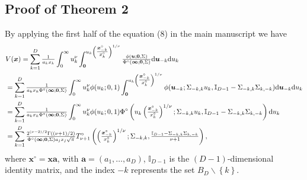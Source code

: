 \documentclass[lineno]{biometrika}
\begin{document}
\subsection{Proof of Theorem 2}
By applying the first half of the equation (8) in the main manuscript %
we have 
\begin{align}
& V(\bm x) = \sum_{k=1}^D{\textstyle{1\over a_kx_k}}\int_0^\infty u_k^\nu \int_{\bm 0}^{u_k \left({\textstyle{\bm x_{-k}^\circ\over x_{k}^\circ}}\right)^{1/\nu}} {\textstyle{\phi(\bm u;\bm 0, \Sigma)\over\Phi^\circ(\bm \infty;\bm 0, \Sigma)}}\text d \bm u_{-k}\text d u_k \nonumber \\ 
&=\sum_{k=1}^D{\textstyle{1\over a_k x_k \Phi^\circ(\bm \infty;\bm 0, \Sigma)}}\int_0^\infty u_k^\nu \phi(u_k;0, 1) \int_{\bm 0}^{u_k\left({\textstyle{\bm x_{-k}^\circ\over x_k^\circ}}\right)^{1/\nu}}\phi(\bm u_{-k}; \Sigma_{-k,k}u_k, \mathbb{I}_{D-1}-\Sigma_{-k,k}\Sigma_{k,-k})\text d \bm u_{-k}\text d u_k \nonumber \\ 
&=\sum_{k=1}^D{\textstyle{1\over a_kx_k \Phi^\circ(\bm \infty;\bm 0, \Sigma)}}\int_0^\infty u_k^\nu \phi(u_k; 0, 1) \Phi^\circ\left(u_k\left({\textstyle{\bm x_{-k}^\circ\over x_k^\circ}}\right)^{1/\nu};\Sigma_{-k,k}u_k,\mathbb{I}_{D-1} -\Sigma_{-k,k}\Sigma_{k,-k}\right)\text d u_k \nonumber \\  
&=\sum_{k=1}^D {\textstyle{2^{(\nu-2)/2} \Gamma((\nu+1)/2)\over\Phi^\circ(\bm \infty;\bm 0, \Sigma) a_jx_j \sqrt{\pi}}} T_{\nu+1}^\circ\left(\left({\textstyle{\bm x_{-k}^\circ\over x_k^\circ}}\right)^{1/\nu};\Sigma_{-k,k},{\textstyle{\mathbb{I}_{D-1}-\Sigma_{-k,k}\Sigma_{k,-k}\over\nu+1}}\right)
\label{eq:truncated_extremal_t_V},
\end{align}
where $\bm x^\circ = \bm x \bm a$, with $\bm a = (a_1, \ldots, a_D)$, $\mathbb{I}_{D-1}$ is the $(D-1)$-dimensional identity matrix, and the index $-k$ represents the set $B_D \backslash \left\{ k\right\}$.
\end{document}
